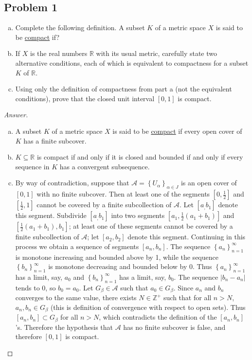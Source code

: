 \documentclass[12pt]{article}
\newcommand{\z}{\mathbb{Z}}
\newcommand{\real}{\mathbb{R}}
\newcommand\setb[1]{\left \{ #1 \right \}}
\newcommand{\sqbrack}[1]{\left [ #1 \right ]}
\theoremstyle{definition}
\begin{document}
\subsection{Problem 1 \texorpdfstring{\cite{Berge}}{}}
\begin{enumerate}[a.]
    \item Complete the following definition. A subset $K$ of a metric space $X$ is said to be \underline{compact} if?
    \item If $X$ is the real numbers $\real$ with its usual metric, carefully state two alternative conditions, each of which is equivalent to compactness for a subset $K$ of $\real$.
    \item Using only the definition of compactness from part a (not the equivalent conditions), prove that the closed unit interval $[0,1]$ is compact.
\end{enumerate}
\begin{proof}[Answer]
    \noindent
    \begin{enumerate}[a.]
        \item A subset $K$ of a metric space $X$ is said to be \underline{compact} if every open cover of $K$ has a finite subcover.
        \item $K \subseteq \real$ is compact if and only if it is closed and bounded if and only if every sequence in $K$ has a convergent subsequence.
        \item By way of contradiction, suppose that $\mathcal{A} = \setb{ U_{\alpha} }_{\alpha \in J}$ is an open cover of $[0,1]$ with no finite subcover. Then at least one of the segments $\sqbrack{0 , \frac{1}{2}}$ and $\sqbrack{\frac{1}{2},1}$ cannot be covered by a finite subcollection of $\mathcal{A}$. Let $\sqbrack{a_,b_1}$ denote this segment. Subdivide $\sqbrack{a_,b_1}$ into two segments $\sqbrack{a_1,\frac{1}{2}(a_1+b_1)}$ and $\sqbrack{\frac{1}{2}(a_1+b_1),b_1}$; at least one of these segments cannot be covered by a finite subcollection of $\mathcal{A}$; let $\sqbrack{a_2,b_2}$ denote this segment. Continuing in this process we obtain a sequence of segments $\sqbrack{a_n,b_n}$. The sequence $\setb{ a_n }_{n=1}^{\infty}$ is monotone increasing and bounded above by 1, while the sequence $\setb{ b_n }_{n=1}^{\infty}$ is monotone decreasing and bounded below by 0. Thus $\setb{ a_n }_{n=1}^{\infty}$ has a limit, say, $a_0$ and $\setb{ b_n }_{n=1}^{\infty}$ has a limit, say, $b_0$. The sequence $|b_n - a_n|$ tends to $0$, so $b_0 = a_0$. Let $G_{\beta} \in \mathcal{A}$ such that $a_0 \in G_{\beta}$. Since $a_n$ and $b_n$ converges to the same value, there exists $N \in \z^+$ such that for all $n > N$, $a_n , b_n \in G_{\beta}$ (this is definition of convergence with respect to open sets). Thus $\sqbrack{a_n,b_n} \subset G_{\beta}$ for all $n > N$, which contradicts the definition of the $\sqbrack{a_n,b_n}$'s. Therefore the hypothesis that $\mathcal{A}$ has no finite subcover is false, and therefore $[0,1]$ is compact.
    \end{enumerate}
\end{proof}
\end{document}
